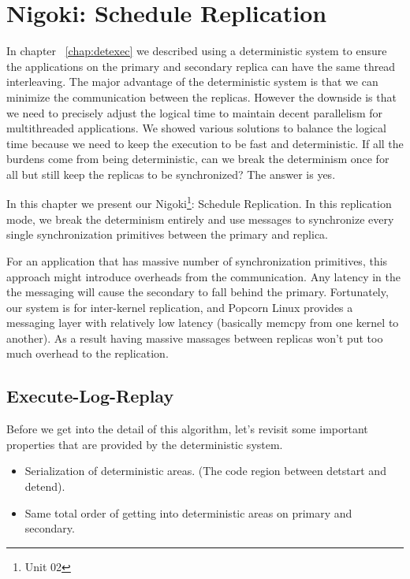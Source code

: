 \chapter{Nigoki: Schedule Replication} \label{chap:schedrep}
In chapter ~\ref{chap:detexec} we described using a deterministic system to ensure the applications on the primary and secondary replica can have the same thread interleaving. The major advantage of the deterministic system is that we can minimize the communication between the replicas. However the downside is that we need to precisely adjust the logical time to maintain decent parallelism for multithreaded applications. We showed various solutions to balance the logical time because we need to keep the execution to be fast and deterministic. If all the burdens come from being deterministic, can we break the determinism once for all but still keep the replicas to be synchronized? The answer is yes.

In this chapter we present our Nigoki\footnote{Unit 02}: Schedule Replication. In this replication mode, we break the determinism entirely and use messages to synchronize every single synchronization primitives between the primary and replica.

For an application that has massive number of synchronization primitives, this approach might introduce overheads from the communication. Any latency in the the messaging will cause the secondary to fall behind the primary. Fortunately, our system is for inter-kernel replication, and Popcorn Linux provides a messaging layer with relatively low latency (basically memcpy from one kernel to another). As a result having massive massages between replicas won't put too much overhead to the replication.


\section{Execute-Log-Replay}
Before we get into the detail of this algorithm, let's revisit some important properties that are provided by the deterministic system.

\begin{itemize}
\item Serialization of deterministic areas. (The code region between detstart and detend).
\item Same total order of getting into deterministic areas on primary and secondary.
\end{itemize}

